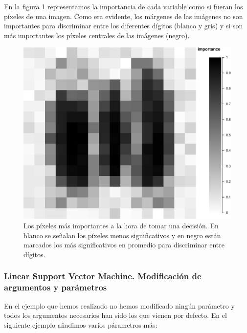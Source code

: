 \documentclass[12pt,spanish,a4paper]{article}
\numberwithin{equation}{section}
\begin{document}
En la figura \ref{fig:varimp_modelo_2_modelo_svmlinear2_paso1}
representamos la importancia de cada variable como si fueran los píxeles
de una imagen. Como era evidente, los márgenes de las imágenes no son
importantes para discriminar entre los diferentes dígitos (blanco y
gris) y si son más importantes los píxeles centrales de las imágenes
(negro).

\begin{figure}[h]

{\centering \includegraphics[width=0.8\linewidth]{graphics/svm/varimp_modelo_2_modelo_svmlinear2_paso1-1} 

}

\caption{Los píxeles más importantes a la hora de tomar una decisión. En blanco se señalan los píxeles menos significativos y en negro están marcados los más significativos en promedio para discriminar entre dígitos.}\label{fig:varimp_modelo_2_modelo_svmlinear2_paso1}
\end{figure}

\clearpage
\newpage

\subsubsection{Linear Support Vector Machine. Modificación de argumentos
y
parámetros}\label{linear-support-vector-machine.-modificacion-de-argumentos-y-parametros}

En el ejemplo que hemos realizado no hemos modificado ningún parámetro y
todos los argumentos necesarios han sido los que vienen por defecto. En
el siguiente ejemplo añadimos varios párametros más:
\end{document}
